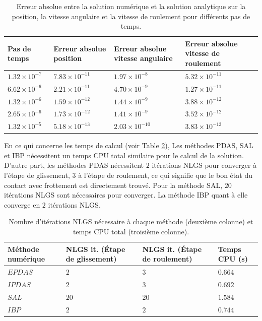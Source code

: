 \begin{center}
\begin{table}[!h]
\begin{tabular}{ |p{2.2cm}|p{3cm}|p{3cm}|p{3.5cm}| }

 \hline \rowcolor{lightgray}
 Pas de temps& Erreur absolue position& Erreur absolue vitesse angulaire& Erreur absolue vitesse de roulement\\
 \hline
 $1.32\times10^{-7}$ & $7.83\times10^{-11}$& $1.97\times10^{-8}$& $5.32\times10^{-11}$ \\
 $6.62\times10^{-6}$ & $2.21\times10^{-11}$& $4.70\times10^{-9}$& $1.27\times10^{-11}$ \\
 $1.32\times10^{-6}$ & $1.59\times10^{-12}$& $1.44\times10^{-9}$& $3.88\times10^{-12}$ \\
 $2.65\times10^{-6}$ & $1.73\times10^{-12}$& $1.41\times10^{-9}$& $3.52\times10^{-12}$ \\
 $1.32\times10^{-5}$ & $5.18\times10^{-13}$& $2.03\times10^{-10}$& $3.83\times10^{-13}$ \\
 \hline
\end{tabular}
\caption{
Erreur absolue entre la solution numérique et la solution analytique sur la position, la vitesse angulaire et la vitesse de roulement pour différents pas de temps.}\label{tab14}
\end{table}
\end{center}

En ce qui concerne les temps de calcul (voir Table \ref{tab15}), Les méthodes PDAS, SAL et IBP nécessitent un temps CPU total similaire pour le calcul de la solution. D'autre part, les méthodes PDAS nécessitent $2$ itérations NLGS pour converger à l'étape de glissement, $ 3 $ à l'étape de roulement, ce qui signifie que le bon état du contact avec frottement est directement trouvé. Pour la méthode SAL, $20$ itérations NLGS sont nécessaires pour converger. La méthode IBP quant à elle converge en $2$ itérations NLGS. 

\begin{center}
\begin{table}[!h]
\begin{tabular}{ |p{3cm}|p{3cm}|p{3cm}|p{2.6cm}| }

 \hline \rowcolor{lightgray}
 Méthode numérique& NLGS it. (Étape de glissement)& NLGS it. (Étape de roulement)& Temps CPU (s)\\
 \hline
 $EPDAS$ & $2$& $3$& $0.664$\\
 $IPDAS$ & $2$& $3$& $0.692$\\
 $SAL$ & $20$& $20$& $1.584$\\
 $IBP$ & $2$& $2$& $0.744$\\
 \hline
\end{tabular}
\caption{Nombre d'itérations NLGS nécessaire à chaque méthode (deuxième colonne) et temps CPU total (troisième colonne).}\label{tab15}
\end{table}
\end{center}


